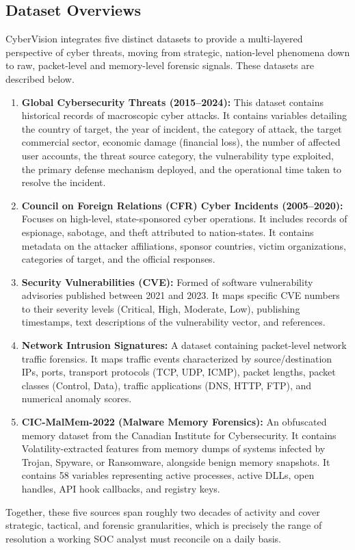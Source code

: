 \documentclass[a4paper, 12pt]{report}
\begin{document}
\subsection{Dataset Overviews}
CyberVision integrates five distinct datasets to provide a multi-layered perspective of cyber threats, moving from strategic, nation-level phenomena down to raw, packet-level and memory-level forensic signals. These datasets are described below.
\begin{enumerate}
    \item \textbf{Global Cybersecurity Threats (2015--2024):} This dataset contains historical records of macroscopic cyber attacks. It contains variables detailing the country of target, the year of incident, the category of attack, the target commercial sector, economic damage (financial loss), the number of affected user accounts, the threat source category, the vulnerability type exploited, the primary defense mechanism deployed, and the operational time taken to resolve the incident.
    \item \textbf{Council on Foreign Relations (CFR) Cyber Incidents (2005--2020):} Focuses on high-level, state-sponsored cyber operations. It includes records of espionage, sabotage, and theft attributed to nation-states. It contains metadata on the attacker affiliations, sponsor countries, victim organizations, categories of target, and the official responses.
    \item \textbf{Security Vulnerabilities (CVE):} Formed of software vulnerability advisories published between 2021 and 2023. It maps specific CVE numbers to their severity levels (Critical, High, Moderate, Low), publishing timestamps, text descriptions of the vulnerability vector, and references.
    \item \textbf{Network Intrusion Signatures:} A dataset containing packet-level network traffic forensics. It maps traffic events characterized by source/destination IPs, ports, transport protocols (TCP, UDP, ICMP), packet lengths, packet classes (Control, Data), traffic applications (DNS, HTTP, FTP), and numerical anomaly scores.
    \item \textbf{CIC-MalMem-2022 (Malware Memory Forensics):} An obfuscated memory dataset from the Canadian Institute for Cybersecurity. It contains Volatility-extracted features from memory dumps of systems infected by Trojan, Spyware, or Ransomware, alongside benign memory snapshots. It contains 58 variables representing active processes, active DLLs, open handles, API hook callbacks, and registry keys.
\end{enumerate}
Together, these five sources span roughly two decades of activity and cover strategic, tactical, and forensic granularities, which is precisely the range of resolution a working SOC analyst must reconcile on a daily basis.
\end{document}
